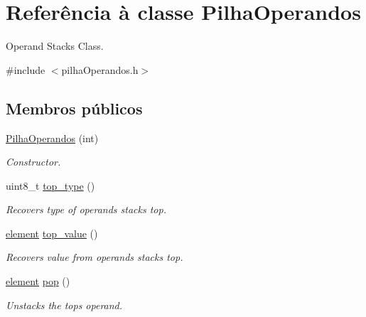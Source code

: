 \hypertarget{classPilhaOperandos}{}\section{Referência à classe Pilha\+Operandos}
\label{classPilhaOperandos}


Operand Stack\textquotesingle{}s Class.  




{\ttfamily \#include $<$pilha\+Operandos.\+h$>$}

\subsection*{Membros públicos}
\begin{DoxyCompactItemize}
\item 
\hyperlink{classPilhaOperandos_ab17dc4822af4e7e7c0962152d93547c6}{Pilha\+Operandos} (int)
\begin{DoxyCompactList}\small\item\em Constructor. \end{DoxyCompactList}\item 
\mbox{\label{classPilhaOperandos_ab44ede250e434c1bb17f21d787977f20}} 
uint8\+\_\+t \hyperlink{classPilhaOperandos_ab44ede250e434c1bb17f21d787977f20}{top\+\_\+type} ()
\begin{DoxyCompactList}\small\item\em Recovers type of operands stack\textquotesingle{}s top. \end{DoxyCompactList}\item 
\mbox{\label{classPilhaOperandos_a2fadf264a2a34fc52f89ef7e1e62f19b}} 
\hyperlink{unionelement__u}{element} \hyperlink{classPilhaOperandos_a2fadf264a2a34fc52f89ef7e1e62f19b}{top\+\_\+value} ()
\begin{DoxyCompactList}\small\item\em Recovers value from operand\textquotesingle{}s stack\textquotesingle{}s top. \end{DoxyCompactList}\item 
\hyperlink{unionelement__u}{element} \hyperlink{classPilhaOperandos_a17a3e3f5e3caad834db7653b2c17ef24}{pop} ()
\begin{DoxyCompactList}\small\item\em Unstacks the top\textquotesingle{}s operand. \end{DoxyCompactList}\item 

\end{DoxyCompactItemize}
